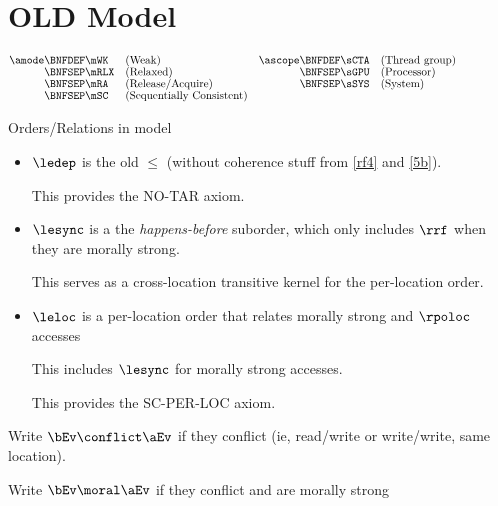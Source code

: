 \section{OLD Model}

\begin{align*}
  \amode \BNFDEF& \mWK &&\text{{(Weak)}}                      &\ascope \BNFDEF& \sCTA &&\text{(Thread group)} &\hbox{$\;\mkern60mu\;$}&
  \\[-1ex] \BNFSEP& \mRLX &&\text{{(Relaxed)}}                & \BNFSEP&\sGPU   &&\text{(Processor)}                                   
  \\[-1ex] \BNFSEP& \mRA &&\text{{(Release/Acquire)}}         & \BNFSEP&\sSYS  &&\text{(System)}                                         
  \\[-1ex] \BNFSEP& \mSC &&\text{{(Sequentially Consistent)}}    
\end{align*}

Orders/Relations in model
\begin{itemize}
\item $\ledep$ is the old $\le$ (without coherence stuff from \ref{rf4} and \ref{5b}).

  This provides the NO-TAR axiom.
\item $\lesync$ is a the \emph{happens-before} suborder, which only includes $\rrf$ when they are morally strong.

  This serves as a cross-location transitive kernel for the per-location order.
  
\item $\leloc$ is a per-location order that relates morally strong  and $\rpoloc$ accesses

  This includes $\lesync$ for  morally strong accesses.

  This provides the SC-PER-LOC axiom.

\end{itemize}

Write $\bEv\conflict\aEv$ if they conflict (ie, read/write or write/write, same location).

Write $\bEv\moral\aEv$ if they conflict and are morally strong


